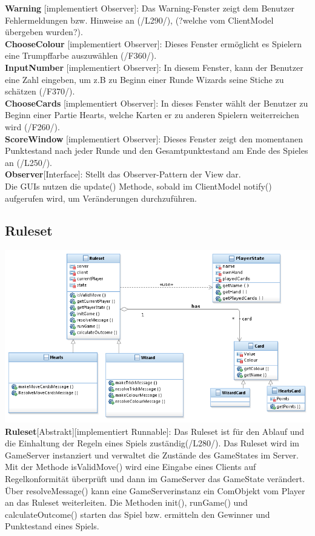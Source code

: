 \documentclass{article}
\begin{document}
\textbf{Warning} [implementiert Observer]: Das Warning-Fenster zeigt dem Benutzer Fehlermeldungen bzw. Hinweise an (/L290/), (?welche vom ClientModel übergeben wurden?). \\

\textbf{ChooseColour} [implementiert Observer]: Dieses Fenster ermöglicht es Spielern eine Trumpffarbe auszuwählen (/F360/). \\

\textbf{InputNumber} [implementiert Observer]: In diesem Fenster, kann der Benutzer eine Zahl eingeben, um z.B zu Beginn einer Runde Wizards seine Stiche zu schätzen (/F370/). \\

\textbf{ChooseCards} [implementiert Observer]: In dieses Fenster wählt der Benutzer zu Beginn einer Partie Hearts, welche Karten er zu anderen Spielern weiterreichen wird (/F260/). \\

\textbf{ScoreWindow} [implementiert Observer]: Dieses Fenster zeigt den momentanen Punktestand nach jeder Runde und den Gesamtpunktestand am Ende des Spieles an (/L250/).\\

\textbf{Observer}[Interface]: Stellt das Observer-Pattern der View dar.\\
 Die GUIs nutzen die update() Methode, sobald im ClientModel notify() aufgerufen wird, um Veränderungen durchzuführen.

\subsection{Ruleset}
\includegraphics[width=\textwidth]{Ruleset}
		\textbf{Ruleset}[Abstrakt][implementiert Runnable]: Das Ruleset  ist für den Ablauf und die Einhaltung der Regeln eines Spiels zuständig(/L280/). Das Ruleset wird im GameServer instanziert und verwaltet die Zustände des GameStates im Server. Mit der Methode isValidMove() wird eine Eingabe eines Clients auf Regelkonformität überprüft und dann im GameServer  das GameState verändert. Über resolveMessage() kann eine GameServerinstanz ein ComObjekt vom Player an das Ruleset weiterleiten. Die Methoden init(), runGame() und calculateOutcome() starten das Spiel bzw. ermitteln den Gewinner und Punktestand eines Spiels. \\ \\
		
\end{document}
